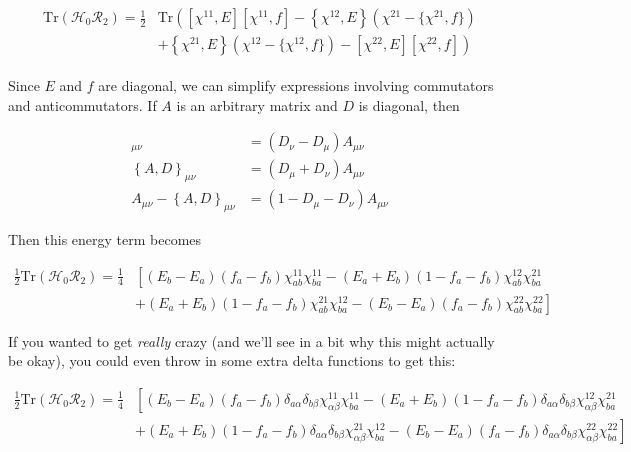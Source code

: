 \begin{align}\label{eqn:H0R2}
\begin{aligned}
\mathrm{Tr}\left(\mathcal{H}_0\mathcal{R}_2\right) = \frac{1}{2}
&\mathrm{Tr} \left([\chi^{11},E][\chi^{11},f] - \left\{\chi^{12},E\right\}(\chi^{21}-\{\chi^{21},f\})\right. \\
&\left.+ \left\{\chi^{21},E\right\}(\chi^{12}-\{\chi^{12},f\}) - [\chi^{22},E][\chi^{22},f]\right)
\end{aligned}
\end{align}

Since $E$ and $f$ are diagonal, we can simplify expressions involving commutators and anticommutators. If $A$ is an arbitrary matrix and $D$ is diagonal, then

\begin{align*}
[A,D]_{\mu\nu} &= (D_\nu-D_\mu)A_{\mu\nu} \\
\left\{A,D\right\}_{\mu\nu} &= (D_\mu+D_\nu)A_{\mu\nu} \\
A_{\mu\nu}-\left\{A,D\right\}_{\mu\nu} &= (1-D_\mu-D_\nu)A_{\mu\nu}
\end{align*}

\noindent Then this energy term becomes

\begin{align*}
\frac{1}{2}\mathrm{Tr}\left(\mathcal{H}_0\mathcal{R}_2\right) = \frac{1}{4}
& \left[(E_b-E_a)(f_a-f_b)\chi^{11}_{ab}\chi^{11}_{ba} - (E_a+E_b)(1-f_a-f_b)\chi^{12}_{ab}\chi^{21}_{ba}\right. \\
&\left.+ (E_a+E_b)(1-f_a-f_b)\chi^{21}_{ab}\chi^{12}_{ba} - (E_b-E_a)(f_a-f_b)\chi^{22}_{ab}\chi^{22}_{ba}\right]
\end{align*}

\noindent If you wanted to get \textit{really} crazy (and we'll see in a bit why this might actually be okay), you could even throw in some extra delta functions to get this:

\begin{align*}
\frac{1}{2}\mathrm{Tr}\left(\mathcal{H}_0\mathcal{R}_2\right) = \frac{1}{4}
& \left[(E_b-E_a)(f_a-f_b)\delta_{a\alpha}\delta_{b\beta}\chi^{11}_{\alpha\beta}\chi^{11}_{ba} - (E_a+E_b)(1-f_a-f_b)\delta_{a\alpha}\delta_{b\beta}\chi^{12}_{\alpha\beta}\chi^{21}_{ba}\right. \\
&\left.+ (E_a+E_b)(1-f_a-f_b)\delta_{a\alpha}\delta_{b\beta}\chi^{21}_{\alpha\beta}\chi^{12}_{ba} - (E_b-E_a)(f_a-f_b)\delta_{a\alpha}\delta_{b\beta}\chi^{22}_{\alpha\beta}\chi^{22}_{ba}\right]
\end{align*}

